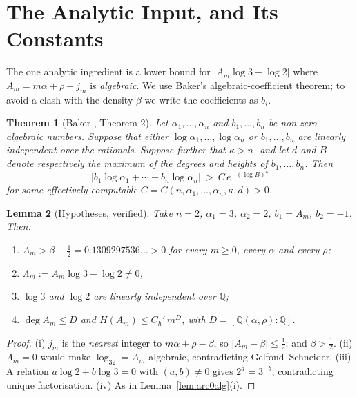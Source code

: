 \documentclass[11pt]{article}
\newtheorem{theorem}{Theorem}[section]
\newtheorem{lemma}[theorem]{Lemma}
\newcommand{\Q}{\mathbb{Q}}
\begin{document}
\section{The Analytic Input, and Its Constants}
\label{sec:analytic}

The one analytic ingredient is a lower bound for $|A_m\log3-\log2|$ where $A_m=m\alpha+\rho-j_m$ is
\emph{algebraic}. We use Baker's algebraic-coefficient theorem; to avoid a clash with the density
$\beta$ we write the coefficients as $b_i$.

\begin{theorem}[Baker \cite{Baker1967III}, Theorem 2]
\label{thm:baker}
Let $\alpha_1,\ldots,\alpha_n$ and $b_1,\ldots,b_n$ be non-zero algebraic numbers. Suppose that
either $\log\alpha_1,\ldots,\log\alpha_n$ or $b_1,\ldots,b_n$ are linearly independent over the
rationals. Suppose further that $\kappa>n$, and let $d$ and $B$ denote respectively the maximum of
the degrees and heights of $b_1,\ldots,b_n$. Then
\[
  |b_1\log\alpha_1+\cdots+b_n\log\alpha_n|\ >\ C\,e^{-(\log B)^\kappa}
\]
for some effectively computable $C=C(n,\alpha_1,\ldots,\alpha_n,\kappa,d)>0$.
\end{theorem}

\begin{lemma}[Hypotheses, verified]
\label{lem:bakerhyp}
Take $n=2$, $\alpha_1=3$, $\alpha_2=2$, $b_1=A_m$, $b_2=-1$. Then:
\begin{enumerate}[label=(\roman*),leftmargin=2.2em]
\item $A_m>\beta-\tfrac12=0.1309297536\ldots>0$ for every $m\ge0$, every $\alpha$ and every $\rho$;
\item $\Lambda_m:=A_m\log3-\log2\ne0$;
\item $\log3$ and $\log2$ are linearly independent over $\Q$;
\item $\deg A_m\le D$ and $H(A_m)\le C_h'\,m^{D}$, with $D=[\Q(\alpha,\rho):\Q]$.
\end{enumerate}
\end{lemma}

\begin{proof}
(i) $j_m$ is the \emph{nearest} integer to $m\alpha+\rho-\beta$, so $|A_m-\beta|\le\tfrac12$; and
$\beta>\tfrac12$. (ii) $\Lambda_m=0$ would make $\log_32=A_m$ algebraic, contradicting
Gelfond--Schneider. (iii) A relation $a\log2+b\log3=0$ with $(a,b)\ne0$ gives $2^a=3^{-b}$,
contradicting unique factorisation. (iv) As in Lemma~\ref{lem:arc0alg}(i).
\end{proof}
\end{document}
